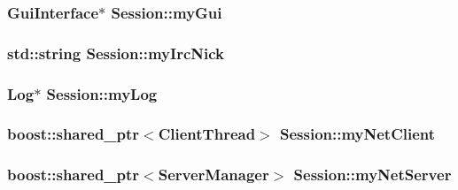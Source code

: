 \hypertarget{class_session_a2725f4b56b109b2e7d75ed780d24fa6d}{
\subsubsection[{my\-Gui}]{\setlength{\rightskip}{0pt plus 5cm}Gui\-Interface$\ast$ Session\-::my\-Gui\hspace{0.3cm}{\ttfamily [private]}}}\label{class_session_a2725f4b56b109b2e7d75ed780d24fa6d}
\hypertarget{class_session_a95063949539c8584d569d777284784ba}{
\subsubsection[{my\-Irc\-Nick}]{\setlength{\rightskip}{0pt plus 5cm}std\-::string Session\-::my\-Irc\-Nick\hspace{0.3cm}{\ttfamily [private]}}}\label{class_session_a95063949539c8584d569d777284784ba}
\hypertarget{class_session_a1d2dd8533f3c551a5c18211f22d380f8}{
\subsubsection[{my\-Log}]{\setlength{\rightskip}{0pt plus 5cm}Log$\ast$ Session\-::my\-Log\hspace{0.3cm}{\ttfamily [private]}}}\label{class_session_a1d2dd8533f3c551a5c18211f22d380f8}
\hypertarget{class_session_a767e3250d6a14be4c2b86d1e2dfa7b3c}{
\subsubsection[{my\-Net\-Client}]{\setlength{\rightskip}{0pt plus 5cm}boost\-::shared\-\_\-ptr$<$Client\-Thread$>$ Session\-::my\-Net\-Client\hspace{0.3cm}{\ttfamily [private]}}}\label{class_session_a767e3250d6a14be4c2b86d1e2dfa7b3c}
\hypertarget{class_session_a0f513f8d52d5026a3c449738da984c29}{
\subsubsection[{my\-Net\-Server}]{\setlength{\rightskip}{0pt plus 5cm}boost\-::shared\-\_\-ptr$<$Server\-Manager$>$ Session\-::my\-Net\-Server\hspace{0.3cm}{\ttfamily [private]}}}\label{class_session_a0f513f8d52d5026a3c449738da984c29}
